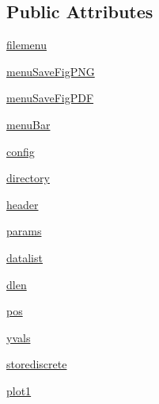 \subsection*{Public Attributes}
\begin{DoxyCompactItemize}
\item 
\hyperlink{class_uni_dec_1_1unidec__modules_1_1_extract2_d_1_1_extract2_d_plot_a32ad30e6c146caa4bc02cb9397403593}{filemenu}
\item 
\hyperlink{class_uni_dec_1_1unidec__modules_1_1_extract2_d_1_1_extract2_d_plot_a5b59c080a326880643876747b6a0436f}{menu\+Save\+Fig\+P\+N\+G}
\item 
\hyperlink{class_uni_dec_1_1unidec__modules_1_1_extract2_d_1_1_extract2_d_plot_aefbc1d820ef6691d47fdb9343e32e0db}{menu\+Save\+Fig\+P\+D\+F}
\item 
\hyperlink{class_uni_dec_1_1unidec__modules_1_1_extract2_d_1_1_extract2_d_plot_a8119cead81f100a5f142e484d004f615}{menu\+Bar}
\item 
\hyperlink{class_uni_dec_1_1unidec__modules_1_1_extract2_d_1_1_extract2_d_plot_a218d4b40377db325c5e1e11efe71c61e}{config}
\item 
\hyperlink{class_uni_dec_1_1unidec__modules_1_1_extract2_d_1_1_extract2_d_plot_a86129fefa6ccf8ca4a7b89b5786bfe32}{directory}
\item 
\hyperlink{class_uni_dec_1_1unidec__modules_1_1_extract2_d_1_1_extract2_d_plot_a5abb810200144b2f878a4b732c603c30}{header}
\item 
\hyperlink{class_uni_dec_1_1unidec__modules_1_1_extract2_d_1_1_extract2_d_plot_af36932f9882538da6bf510084589a5c3}{params}
\item 
\hyperlink{class_uni_dec_1_1unidec__modules_1_1_extract2_d_1_1_extract2_d_plot_a8e7fe4c28ef8b48713a7b38945bc1fc9}{datalist}
\item 
\hyperlink{class_uni_dec_1_1unidec__modules_1_1_extract2_d_1_1_extract2_d_plot_a3753b74207877296549052919dbd8e2c}{dlen}
\item 
\hyperlink{class_uni_dec_1_1unidec__modules_1_1_extract2_d_1_1_extract2_d_plot_a0a87ac645192429a132a3a2230dd3ace}{pos}
\item 
\hyperlink{class_uni_dec_1_1unidec__modules_1_1_extract2_d_1_1_extract2_d_plot_a4e01f13dd9df45c8baf48d5ad775bf2c}{yvals}
\item 
\hyperlink{class_uni_dec_1_1unidec__modules_1_1_extract2_d_1_1_extract2_d_plot_aef3f73cdaf430e1684959fedca156883}{storediscrete}
\item 
\hyperlink{class_uni_dec_1_1unidec__modules_1_1_extract2_d_1_1_extract2_d_plot_a085ea88a5ed0f0cf002f67e1a62bff7e}{plot1}

\end{DoxyCompactItemize}

